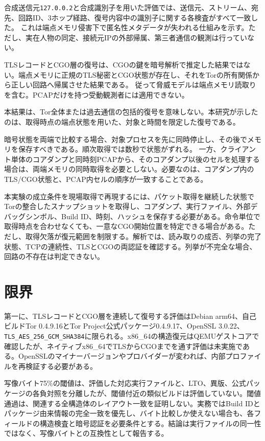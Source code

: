 \documentclass[10pt,a4paper]{ltjsarticle}
\newcommand{\code}[1]{\nolinkurl{#1}}
\begin{document}
合成送信元\code{127.0.0.2}と合成識別子を用いた評価では、送信元、ストリーム、宛先、回路ID、3ホップ経路、復号内容中の識別子に関する各検査がすべて一致した。
これは端点メモリ侵害下で匿名性メタデータが失われる仕組みを示す。ただし、実在人物の同定、接続元IPの外部帰属、第三者通信の観測は行っていない。


TLSレコードとCGO層の復号は、CGOの鍵を暗号解析で推定した結果ではない。端点メモリに正規のTLS秘密とCGO状態が存在し、それをTorの所有関係から正しい回路へ帰属させた結果である。
従って脅威モデルは端点メモリ読取りを含む。PCAPだけを持つ受動観測者には適用できない。

本結果は、Tor全体または過去通信の包括的復号を意味しない。本研究が示したのは、取得時点の端点状態を用いた、対象と時間を限定した復号である。


暗号状態を両端で比較する場合、対象プロセスを先に同時停止し、その後でメモリを保存すべきである。順次取得では数秒で状態がずれる。
一方、クライアント単体のコアダンプと同時刻PCAPから、そのコアダンプ以後のセルを処理する場合は、両端メモリの同時取得を必要としない。必要なのは、コアダンプ内のTLS/CGO状態と、PCAP内セルの順序が一致することである。

本実験の成立条件を現場取得で再現するには、パケット取得を継続した状態でTorの整合したスナップショットを取得し、コアダンプ、実行ファイル、外部デバッグシンボル、Build ID、時刻、ハッシュを保存する必要がある。命令単位で取得時点を合わせなくても、一意なCGO開始位置を特定できる場合がある。ただし、取得欠落が復元範囲を制限する。解析では、読み取りの成否、列挙の完了状態、TCPの連続性、TLSとCGOの両認証を確認する。列挙が不完全な場合、回路の不存在は判定できない。

\section{限界}\label{sec:limitations}

第一に、TLSレコードとCGO層を連続して復号する評価はDebian arm64、自己ビルドTor 0.4.9.16とTor Project公式パッケージ0.4.9.17、OpenSSL 3.0.22、\code{TLS_AES_256_GCM_SHA384}に限られる。x86\_64の構造復元はQEMUゲストコアで確認したが、ネイティブx86\_64でTLSからCGOまでを通す評価は未実施である。OpenSSLのマイナーバージョンやプロバイダーが変われば、内部プロファイルを再検証する必要がある。

写像バイト75\%の閾値は、評価した対応実行ファイルと、LTO、異版、公式パッケージの各負対照を分離したが、閾値付近の類似ビルドは評価していない。閾値通過は、関連する全構造体のレイアウト一致を証明しない。実務ではBuild IDとパッケージ由来情報の完全一致を優先し、バイト比較しか使えない場合も、各フィールドの構造検査と暗号認証を必要条件とする。結論は実行ファイルの同一性ではなく、写像バイトとの互換性として報告する。
\end{document}
